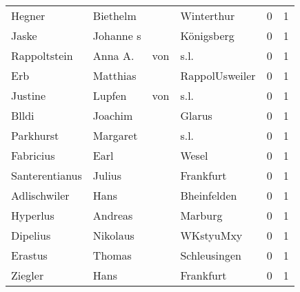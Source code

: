 \documentclass[10pt,a4paper,landscape]{article}
\begin{document}
\begin{longtable}{llllrr}
                   Hegner &                           Biethelm &             &                                  Winterthur &          0 &         1 \\
                    Jaske &                          Johanne s &             &                                  Königsberg &          0 &         1 \\
             Rappoltstein &                            Anna A. &         von &                                        s.l. &          0 &         1 \\
                      Erb &                           Matthias &             &                              RappolUsweiler &          0 &         1 \\
                  Justine &                             Lupfen &         von &                                        s.l. &          0 &         1 \\
                    Blldi &                            Joachim &             &                                      Glarus &          0 &         1 \\
                Parkhurst &                           Margaret &             &                                        s.l. &          0 &         1 \\
                Fabricius &                               Earl &             &                                       Wesel &          0 &         1 \\
           Santerentianus &                             Julius &             &                                   Frankfurt &          0 &         1 \\
             Adlischwiler &                               Hans &             &                                 Bheinfelden &          0 &         1 \\
                 Hyperlus &                            Andreas &             &                                     Marburg &          0 &         1 \\
                 Dipelius &                           Nikolaus &             &                                   WKstyuMxy &          0 &         1 \\
                  Erastus &                             Thomas &             &                                Schleusingen &          0 &         1 \\
                  Ziegler &                               Hans &             &                                   Frankfurt &          0 &         1 \\

\end{longtable}
\end{document}
